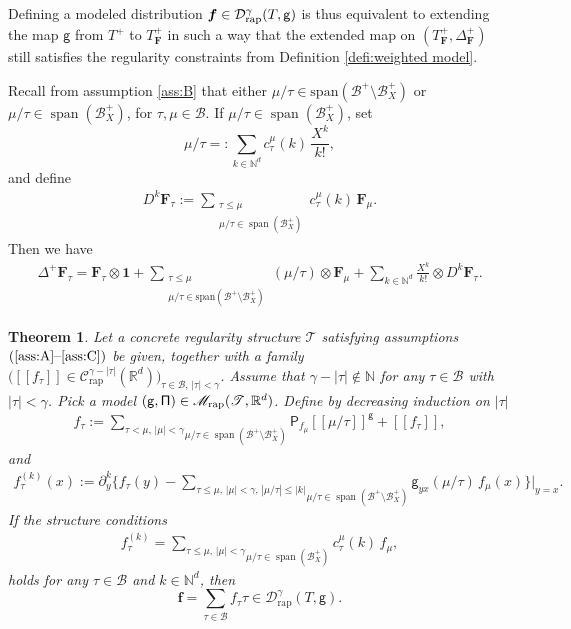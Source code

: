 \documentclass[JEP,XML,SOM,Unicode,published]{cedram}
\DeclareMathOperator{\Span}{span}
\theoremstyle{plain}
\newtheorem{thm}{Theorem}
\theoremstyle{definition}
\newcommand{\unit}{\mathbf{1}}
\newcommand{\Brac}[1]{[\![#1]\!]}
\newcommand{\bsf}{\boldsymbol{f}}
\newcommand{\rap}{\mathrm{rap}}
\newcommand{\sfP}{\mathsf{P}}
\newcommand{\sfg}{\mathsf{g}}
\newcommand{\bsF}{\boldsymbol{F}}
\newcommand{\scrM}{\mathscr{M}}
\newcommand{\scrT}{\mathscr{T}}
\newcommand{\bbN}{\mathbb{N}}
\newcommand{\bbR}{\mathbb{R}}
\newcommand{\mcB}{\mathcal{B}}
\newcommand{\mcC}{\mathcal{C}}
\newcommand{\mcD}{\mathcal{D}}
\begin{document}
Defining a modeled distribution $\bsf\in\mcD_\rap^\gamma(T,\sf g)$ is thus equivalent to extending the map $\sfg$ from $T^+$ to $T_{\bsF}^+$ in such a way that the extended map on $(T_{\bsF}^+,\Delta^+_{\bsF})$ still satisfies the regularity constraints from Definition \ref{defi:weighted model}.

Recall from assumption \eqref{ass:B} that either $\mu/\tau\in\textrm{span}(\mcB^+\setminus\mcB^+_X)$ or $\mu/\tau\in \Span (\mcB_X^+)$, for $\tau,\mu\in\mcB$.
If $\mu/\tau\in \Span (\mcB_X^+)$, set
\[
\mu/\tau =: \sum_{k\in\bbN^d} c_\tau^\mu(k)\,\frac{X^k}{k!},
\]
and define
\begin{align}\label{eq:k-antiderivative}
D^k\bsF_\tau := \sum_{\substack{\tau\leq \mu \\ \mu/\tau\in\Span (\mcB_X^+)}} c_\tau^\mu(k) \, \bsF_\mu.
\end{align}
Then we have
\begin{align*}
\Delta^+\bsF_\tau = \bsF_\tau\otimes\unit + \sum_{\substack{\tau\leq\mu \\ \mu/\tau\in\textrm{span}(\mcB^+\setminus\mcB^+_X)} }(\mu/\tau)\otimes \bsF_\mu + \sum_{k\in\bbN^d}\frac{X^k}{k!}\otimes D^k\bsF_\tau.
\end{align*}

\begin{thm} \label{thm:PD to MD}
Let a concrete regularity structure $\scrT$ satisfying assumptions $\textup{(\ref{ass:A}--\ref{ass:C})}$ be given, together with a family $\bigl(\Brac{f_\tau}\in\mcC_\rap^{\gamma-|\tau|}(\bbR^d)\bigr)_{\tau\in\mcB,\,\vert\tau\vert<\gamma}$. Assume that $\gamma-|\tau|\notin\bbN$ for any $\tau\in\mcB$ with $|\tau|<\gamma$. Pick a model ${\sf (g,\Pi)}\in\scrM_\rap(\scrT,\bbR^d)$. Define by decreasing induction on $\vert\tau\vert$
\begin{align*}
f_\tau := \underset{\mu/\tau\in\Span (\mcB^+\setminus\mcB^+_X)}{\sum_{\tau<\mu, \,|\mu|<\gamma}} \sfP_{f_\mu}\Brac{\mu/\tau}^\sfg + \Brac{f_\tau},
\end{align*}
and
\begin{align} \label{usual condition on MD}
f_{\tau}^{(k)}(x) := \partial_y^k\bigg\{f_\tau(y) -
\underset{\mu/\tau\in\Span (\mcB^+\setminus\mcB^+_X)}{\sum_{\tau\leq\mu, \,|\mu|<\gamma,\, |\mu/\tau|\le|k|}}
\sfg_{yx}(\mu/\tau)\,f_\mu(x)\bigg\}\Big|_{y=x}.
\end{align}
If the \emph{structure conditions}
\begin{align} \label{structure condition}
f_{\tau}^{(k)} = \underset{\mu/\tau\in\Span (\mcB_X^+)}{\sum_{\tau\leq\mu, \,|\mu|<\gamma}} c_\tau^\mu(k) \, f_\mu,
\end{align}
holds for any $\tau\in\mcB$ and $k\in\bbN^d$, then
\[
\bsf = \sum_{\tau\in\mcB}f_\tau\tau\in\mcD_\rap^{\gamma}(T, \sfg).
\]
\end{thm}
\end{document}
